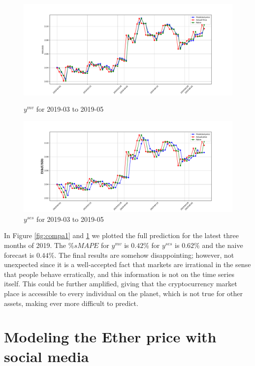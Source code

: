 \begin{figure}[h!]
	\centering
	\begin{minipage}[b]{\textwidth}
		\includegraphics[width=\textwidth]{data/pre_2019_mv.pdf}
		\caption{$y^{mv}$ for 2019-03 to 2019-05}
		\label{fig:compa1}
	\end{minipage}
	\hfill
	\begin{minipage}[b]{\textwidth}
		\includegraphics[width=\textwidth]{data/pre_2019_ses.pdf}
		\caption{$y^{ses}$ for 2019-03 to 2019-05}
		\label{fig:compa2}
	\end{minipage}
\end{figure}

In Figure \ref{fig:compa1} and \ref{fig:compa2} we plotted the full prediction for the latest three months of 2019. The $\%sMAPE$ for 
$y^{mv}$ is $0.42\%$ for $y^{ses}$ is $0.62\%$ and the naive forecast is $0.44\%$. The final results are somehow disappointing; however, not unexpected since it is a well-accepted fact that markets are irrational in the sense that people behave erratically, and this information is not on the time series itself. This could be further amplified, giving that the cryptocurrency market place is accessible to every individual on the planet, which is not true for other assets, making ever more difficult to predict.


\section{Modeling the Ether price with social media}

